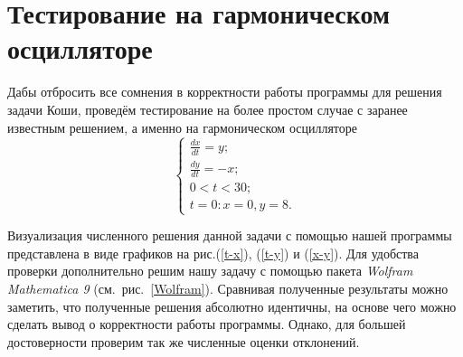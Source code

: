 

\section{Тестирование на гармоническом осцилляторе}
Дабы отбросить все сомнения в корректности работы программы для решения задачи Коши, проведём тестирование на более простом случае с заранее известным решением, а именно на гармоническом осцилляторе
\[
\begin{cases}
	\frac{d x}{d t} = y;\\
	\frac{d y}{d t} = -x;\\
	0 < t < 30; \\
	t = 0: x = 0, y = 8.
\end{cases}
\]

Визуализация численного решения данной задачи с помощью нашей программы представлена в виде графиков на рис.(\ref{t-x}), (\ref{t-y}) и (\ref{x-y}). Для удобства проверки дополнительно решим нашу задачу с помощью пакета {\it Wolfram Mathematica 9} (см.~рис.~\ref{Wolfram}).
Сравнивая полученные результаты можно заметить, что полученные решения абсолютно идентичны, на основе чего можно сделать вывод о корректности работы программы. Однако, для большей достоверности проверим так же численные оценки отклонений.\\
